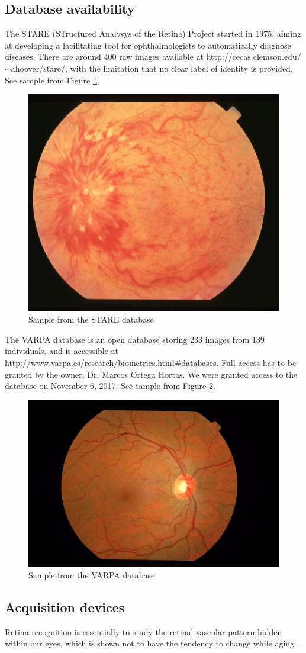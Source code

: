 \documentclass[a4paper,11pt]{article}
\theoremstyle{plain} %
\begin{document}
\subsection{Database availability}

The STARE (STructured Analysys of the Retina) Project started in 1975, aiming at developing a facilitating tool for ophthalmologists to automatically diagnose diseases. There are around 400 raw images available at http://cecas.clemson.edu/$\sim$ahoover/stare/, with the limitation that no clear label of identity is provided. See sample from Figure \ref{fig1}.

\begin{figure}[!ht]
	\begin{center}
		\includegraphics[width=.35\textwidth, height=.35\textheight,keepaspectratio]{im0019}
	\end{center}
	\caption{Sample from the STARE database}
	\label{fig1}
\end{figure}

The VARPA database is an open database storing 233 images from 139 individuals, and is accessible at http://www.varpa.es/research/biometrics.html\#databases. Full access has to be granted by the owner, Dr. Marcos Ortega Hortas. We were granted access to the database on November 6, 2017. See sample from Figure \ref{fig2}.

\begin{figure}[!ht]
	\begin{center}
		\includegraphics[width=.35\textwidth, height=.35\textheight,keepaspectratio]{IM000003_17}
	\end{center}
	\caption{Sample from the VARPA database}
	\label{fig2}
\end{figure}

\subsection{Acquisition devices}
Retina recognition is essentially to study the retinal vascular pattern hidden within our eyes, which is shown not to have the tendency to change while aging \cite{fatima2013feature}. 
\end{document}
